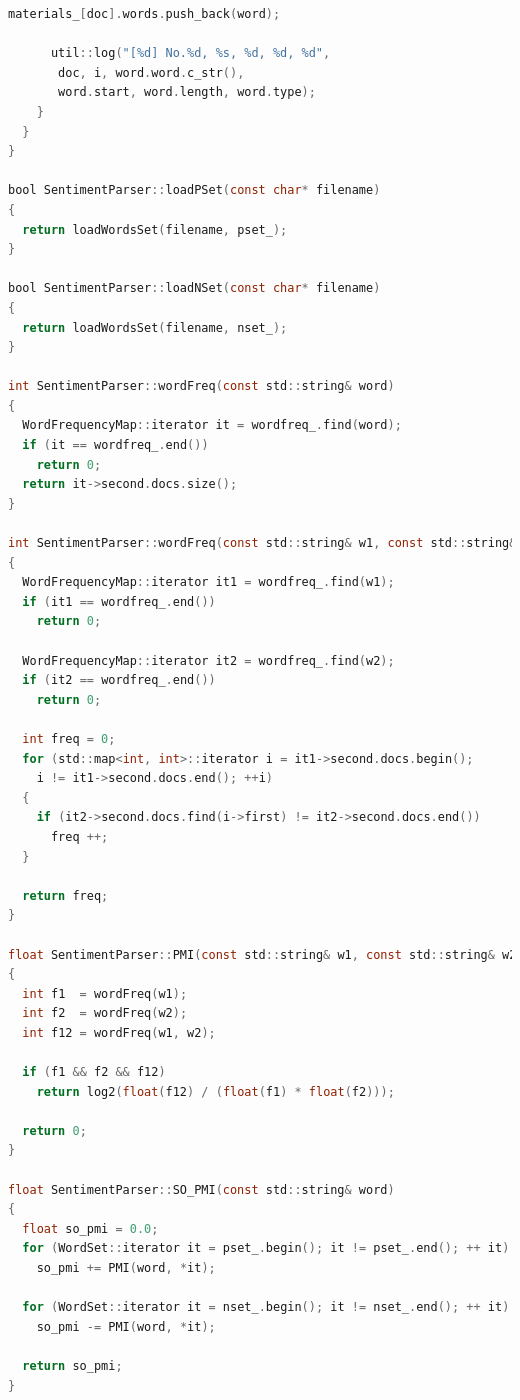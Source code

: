 \documentclass[11pt,a4paper]{article}
\begin{document}
{\begin{lstlisting}[language=C]
      materials_[doc].words.push_back(word);

      util::log("[%d] No.%d, %s, %d, %d, %d",
       doc, i, word.word.c_str(), 
       word.start, word.length, word.type);
    }
  }
}

bool SentimentParser::loadPSet(const char* filename)
{
  return loadWordsSet(filename, pset_);
}
  
bool SentimentParser::loadNSet(const char* filename)
{
  return loadWordsSet(filename, nset_);
}

int SentimentParser::wordFreq(const std::string& word)
{
  WordFrequencyMap::iterator it = wordfreq_.find(word);
  if (it == wordfreq_.end())
    return 0;
  return it->second.docs.size();
}

int SentimentParser::wordFreq(const std::string& w1, const std::string& w2)
{
  WordFrequencyMap::iterator it1 = wordfreq_.find(w1);
  if (it1 == wordfreq_.end())
    return 0;

  WordFrequencyMap::iterator it2 = wordfreq_.find(w2);
  if (it2 == wordfreq_.end())
    return 0;

  int freq = 0;
  for (std::map<int, int>::iterator i = it1->second.docs.begin(); 
  	i != it1->second.docs.end(); ++i)
  {
    if (it2->second.docs.find(i->first) != it2->second.docs.end())
      freq ++;
  }

  return freq;
}

float SentimentParser::PMI(const std::string& w1, const std::string& w2)
{
  int f1  = wordFreq(w1);
  int f2  = wordFreq(w2);
  int f12 = wordFreq(w1, w2);

  if (f1 && f2 && f12)
    return log2(float(f12) / (float(f1) * float(f2)));

  return 0;
}

float SentimentParser::SO_PMI(const std::string& word)
{
  float so_pmi = 0.0;
  for (WordSet::iterator it = pset_.begin(); it != pset_.end(); ++ it)
    so_pmi += PMI(word, *it);

  for (WordSet::iterator it = nset_.begin(); it != nset_.end(); ++ it)
    so_pmi -= PMI(word, *it);

  return so_pmi;
}
\end{lstlisting}}
\end{document}
